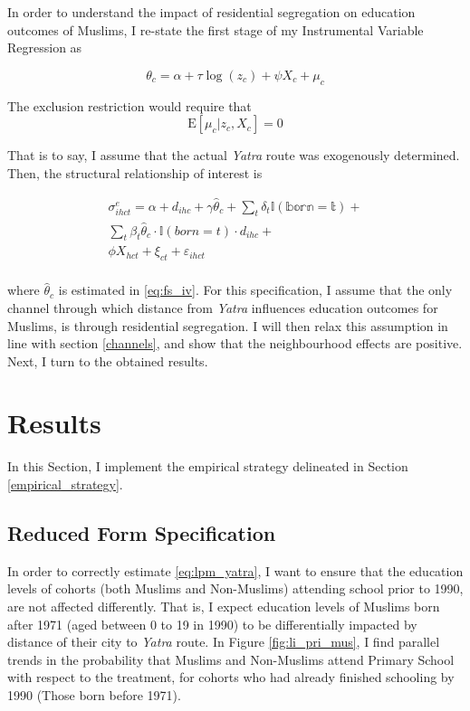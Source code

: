 \documentclass{article}
\newcommand{\E}{\mathrm{E}}
\begin{document}
 In order to understand the impact of residential segregation on education outcomes of Muslims, I re-state the first stage of my Instrumental Variable Regression as 

\begin{equation}\label{eq:fs_iv}\tag{$\star$}
    \theta_c = \alpha + \tau \log(z_c) + \psi X_{c} + \mu_c
\end{equation}

The exclusion restriction would require that
\begin{equation}\label{eq:a5}\tag{A5}
    \E[\mu_c | z_c, X_c] = 0
\end{equation}

That is to say, I assume that the actual \emph{Yatra} route was exogenously determined. Then, the structural relationship of interest is

\begin{equation}\label{eq:lpm_yatra_iv} \tag{$\star \star$}
\begin{split}
       \sigma_{ihct}^e = \alpha + d_{ihc} + \gamma \hat{\theta}_c + \sum_{t}\delta_{t} \mathbb{I(born = t)} + \\
       \sum_{t} \beta_{t} \hat{\theta}_c \cdot \mathbb{I} (born = t) \cdot d_{ihc}+ \\
       \phi X_{hct} + \xi_{ct} + \varepsilon_{ihct} \\
\end{split}
\end{equation}

where $\hat{\theta}_c$ is estimated in \eqref{eq:fs_iv}. For this specification, I assume that the only channel through which distance from \emph{Yatra} influences education outcomes for Muslims, is through residential segregation. I will then relax this assumption in line with section \ref{channels}, and show that the neighbourhood effects are positive. Next, I turn to the obtained results.

\section{Results}\label{results}
In this Section, I implement the empirical strategy delineated in Section \ref{empirical_strategy}.

\subsection{Reduced Form Specification}\label{reduced_form_results}
In order to correctly estimate \eqref{eq:lpm_yatra}, I want to ensure that the education levels of cohorts (both Muslims and Non-Muslims) attending school prior to 1990, are not affected differently. That is, I expect education levels of Muslims born after 1971 (aged between 0 to 19 in 1990) to be differentially impacted by distance of their city to \textit{Yatra} route. In Figure \ref{fig:li_pri_mus}, I find parallel trends in the probability that Muslims and Non-Muslims attend Primary School with respect to the treatment, for cohorts who had already finished schooling by 1990 (Those born before 1971).
\end{document}
